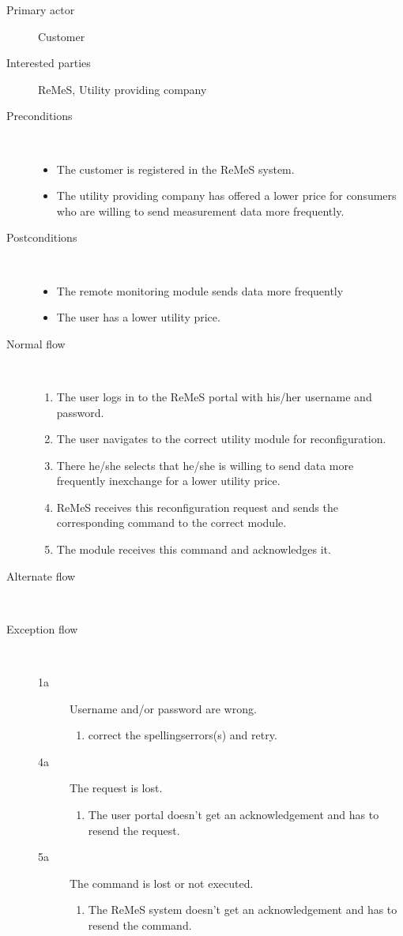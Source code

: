 \begin{description}
	\item[Primary actor] Customer
	\item[Interested parties] ReMeS, Utility providing company
	\item[Preconditions] \ 
	\begin{itemize}
		\item The customer is registered in the ReMeS system.
		\item The utility providing company has offered a lower price for consumers
		who are willing to send measurement data more frequently.
	\end{itemize}
	\item[Postconditions] \ 
	\begin{itemize}
		\item The remote monitoring module sends data more frequently
		\item The user has a lower utility price.
	\end{itemize}
	\item[Normal flow] \ 
	\begin{enumerate}
	  	\item The user logs in to the ReMeS portal with his/her username and
	  	password.
	  	\item The user navigates to the correct utility module for reconfiguration.
	  	\item There he/she selects that he/she is willing to send data more
	  	frequently inexchange for a lower utility price.
	  	\item ReMeS receives this reconfiguration request and sends the
	  	corresponding command to the correct module.
	  	\item The module receives this command and acknowledges it.
	\end{enumerate}
	\item[Alternate flow] \ 
	\begin{description}
		\item
	\end{description}
	\item[Exception flow] \ 
	\begin{description}
		\item[1a] Username and/or password are wrong.
		\begin{enumerate}
		  \item correct the spellingserrors(s) and retry.
		\end{enumerate}
		\item[4a] The request is lost.
		\begin{enumerate}
		  \item The user portal doesn't get an acknowledgement and has to resend the
		  request.
		\end{enumerate}
		\item[5a] The command is lost or not executed.
		\begin{enumerate}
		  \item The ReMeS system doesn't get an acknowledgement and has to resend the
		  command.
		 \end{enumerate}
	\end{description}
\end{description}